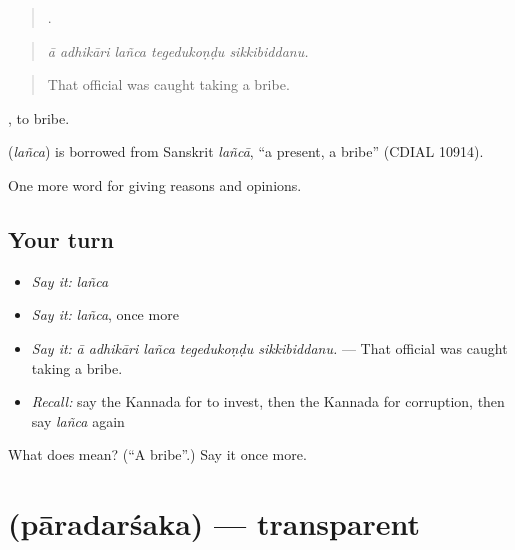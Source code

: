 \begin{quote}
    .
\end{quote}

\begin{quote}
\emph{ā adhikāri lañca tegedukoṇḍu sikkibiddanu.}
\end{quote}

\begin{quote}
That official was caught taking a bribe.
\end{quote}

 , to bribe.

\begin{cousinweb}
\textbf{} (\emph{lañca}) is borrowed from Sanskrit \emph{lañcā}, \textquotedblleft{}a present, a bribe\textquotedblright{} (CDIAL 10914).
\end{cousinweb}

\begin{grammarlens}[title={What you've built}]
One more word for giving reasons and opinions.
\end{grammarlens}

\subsection*{Your turn}
\begin{itemize}
\raggedright
  \item \emph{Say it:} \emph{lañca}
  \item \emph{Say it:} \emph{lañca}, once more
  \item \emph{Say it:} \emph{ā adhikāri lañca tegedukoṇḍu sikkibiddanu.} — That official was caught taking a bribe.
  \item \emph{Recall:} say the Kannada for to invest, then the Kannada for corruption, then say \emph{lañca} again
\end{itemize}

\begin{tcolorbox}[breakable,colback=teal!4,colframe=teal!35!black,title={Before you move on}]
What does  mean? (\textquotedblleft{}A bribe\textquotedblright{}.) Say it once more.
\end{tcolorbox}
\section[\texorpdfstring{\kn{ಪಾರದರ್ಶಕ} (pāradarśaka)}{ಪಾರದರ್ಶಕ (pāradarśaka)}]{ (pāradarśaka) — transparent}

